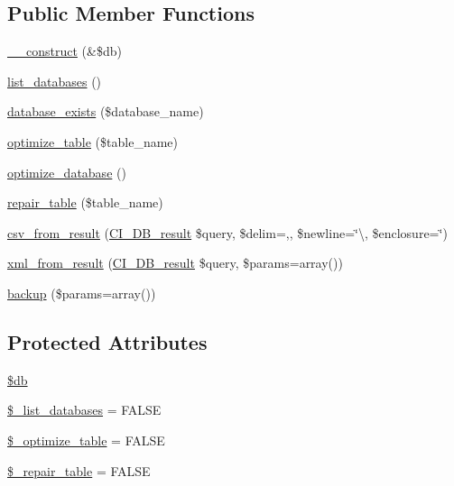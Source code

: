 \subsection*{Public Member Functions}
\begin{DoxyCompactItemize}
\item 
\mbox{\hyperlink{class_c_i___d_b__utility_aaf2ef772755ec6f361d44e16cc9ffd69}{\+\_\+\+\_\+construct}} (\&\$db)
\item 
\mbox{\hyperlink{class_c_i___d_b__utility_a8486b247a8868504b055622cb2dd34d3}{list\+\_\+databases}} ()
\item 
\mbox{\hyperlink{class_c_i___d_b__utility_ac0ba63aa14b19a37d4773fcc252bde81}{database\+\_\+exists}} (\$database\+\_\+name)
\item 
\mbox{\hyperlink{class_c_i___d_b__utility_a6aed9274f43b64eeee607d172b51529d}{optimize\+\_\+table}} (\$table\+\_\+name)
\item 
\mbox{\hyperlink{class_c_i___d_b__utility_acb26598e177f525b39978f6dfca1f212}{optimize\+\_\+database}} ()
\item 
\mbox{\hyperlink{class_c_i___d_b__utility_a41a627004d26198c69bf466eef7eaeeb}{repair\+\_\+table}} (\$table\+\_\+name)
\item 
\mbox{\hyperlink{class_c_i___d_b__utility_a0d3767ad00f08b93fa1f6071af5f1b6a}{csv\+\_\+from\+\_\+result}} (\mbox{\hyperlink{class_c_i___d_b__result}{C\+I\+\_\+\+D\+B\+\_\+result}} \$query, \$delim=\textquotesingle{},\textquotesingle{}, \$newline=\char`\"{}\textbackslash{}, \$enclosure=\textquotesingle{}\char`\"{}\textquotesingle{})
\item 
\mbox{\hyperlink{class_c_i___d_b__utility_a21f75f7a8f3c41f9d2ec60b00f412783}{xml\+\_\+from\+\_\+result}} (\mbox{\hyperlink{class_c_i___d_b__result}{C\+I\+\_\+\+D\+B\+\_\+result}} \$query, \$params=array())
\item 
\mbox{\hyperlink{class_c_i___d_b__utility_abe2b9d47f950dfbaf8c6ec757a9af9a2}{backup}} (\$params=array())
\end{DoxyCompactItemize}
\subsection*{Protected Attributes}
\begin{DoxyCompactItemize}
\item 
\mbox{\hyperlink{class_c_i___d_b__utility_a1fa3127fc82f96b1436d871ef02be319}{\$db}}
\item 
\mbox{\hyperlink{class_c_i___d_b__utility_afe3a5b80562d93d6bc7e2b53c95b7e5a}{\$\+\_\+list\+\_\+databases}} = F\+A\+L\+SE
\item 
\mbox{\hyperlink{class_c_i___d_b__utility_a083199e5c22c78912dae0a47bb2d7fad}{\$\+\_\+optimize\+\_\+table}} = F\+A\+L\+SE
\item 
\mbox{\hyperlink{class_c_i___d_b__utility_a5cf925cbd52e3f6ba5b7ada3fa436efc}{\$\+\_\+repair\+\_\+table}} = F\+A\+L\+SE
\end{DoxyCompactItemize}


